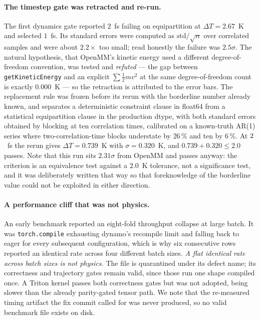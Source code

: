 \paragraph*{The timestep gate was retracted and re-run.} The first dynamics gate reported
$2$~fs failing on equipartition at $\Delta T = 2.67$~K and selected $1$~fs. Its standard errors
were computed as $\mathrm{std}/\sqrt{n}$ over correlated samples and were about $2.2\times$ too
small; read honestly the failure was $2.5\sigma$. The natural hypothesis, that OpenMM's kinetic
energy used a different degree-of-freedom convention, was tested and \emph{refuted} --- the gap
between \texttt{getKineticEnergy} and an explicit $\sum \tfrac12 m v^2$ at the same
degree-of-freedom count is exactly $0.000$~K --- so the retraction is attributed to the error
bars. The replacement rule was frozen before its rerun with the borderline number already known,
and separates a deterministic constraint clause in float64 from a statistical equipartition
clause in the production dtype, with both standard errors obtained by blocking at ten
correlation times, calibrated on a known-truth AR(1) series where two-correlation-time blocks
understate by $26\,\%$ and ten by $6\,\%$. At $2$~fs the rerun gives $\Delta T = 0.739$~K with
$\sigma = 0.320$~K, and $0.739 + 0.320 \leq 2.0$ passes. Note that this run sits $2.31\sigma$ from
OpenMM and passes anyway: the criterion is an equivalence test against a $2.0$~K tolerance, not a
significance test, and it was deliberately written that way so that foreknowledge of the
borderline value could not be exploited in either direction.

\paragraph*{A performance cliff that was not physics.} An early benchmark reported an eight-fold
throughput collapse at large batch. It was \texttt{torch.compile} exhausting dynamo's recompile
limit and falling back to eager for every subsequent configuration, which is why six consecutive
rows reported an identical rate across four different batch sizes. \emph{A flat identical rate
across batch sizes is not physics.} The file is quarantined under its defect name; its
correctness and trajectory gates remain valid, since those run one shape compiled once. A Triton
kernel passes both correctness gates but was not adopted, being slower than the already
parity-gated tensor path. We note that the re-measured timing artifact the fix commit called for
was never produced, so no valid benchmark file exists on disk.

